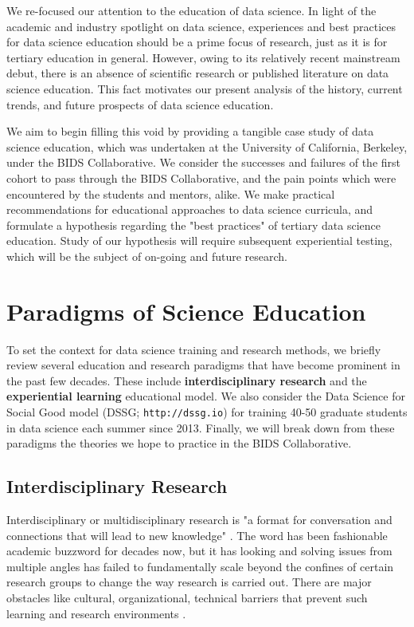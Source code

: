 \documentclass{sig-alternate}
\begin{document}
We re-focused our attention to the education of data science. In light of the academic and industry spotlight on data science, experiences  and best practices for data science education should be a prime focus of research, just as it is for tertiary education in general.  However, owing to its relatively recent mainstream debut, there is an absence of scientific research or published literature on data science education.  This fact motivates our present analysis of the history, current trends, and future prospects of data science education.

We aim to begin filling this void by providing a tangible case study of data science education, which was undertaken at the University of California, Berkeley, under the BIDS Collaborative. We consider the successes and failures of the first cohort to pass through the BIDS Collaborative, and the pain points which were encountered by the students and mentors, alike.  We make practical recommendations for educational approaches to data science curricula, and formulate a hypothesis regarding the "best practices" of tertiary data science education.  Study of our hypothesis will require subsequent experiential testing, which will be the subject of on-going and future research.



\section{Paradigms of Science Education}

To set the context for data science training and research methods, we briefly review several education and research paradigms that have become prominent in the past few decades. These include \textbf{interdisciplinary research} and the \textbf{experiential learning} educational model. We also consider the Data Science for Social Good model (DSSG; \texttt{http://dssg.io}) for training 40-50 graduate students in data science each summer since 2013. Finally, we will break down from these paradigms the theories we hope to practice in the BIDS Collaborative.

\subsection{Interdisciplinary Research}

Interdisciplinary or multidisciplinary research is "a format for conversation and connections that will lead to new knowledge" \cite{repko2008interdisciplinary}. The word has been fashionable academic buzzword for decades now, but it has looking and solving issues from multiple angles has failed to fundamentally scale beyond the confines of certain research groups to change the way research is carried out. There are major obstacles like cultural, organizational, technical barriers that prevent such learning and research environments \cite{eisenberg2000bridging}.
\end{document}

